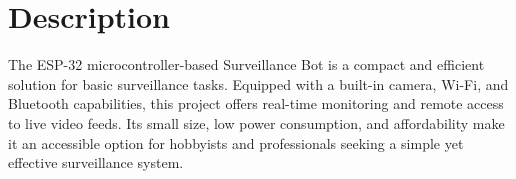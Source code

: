 \documentclass[12pt]{article}
\begin{document}


\thispagestyle{empty}


\newpage

\tableofcontents 

\newpage


\sectionfont{\setcounter{secnumdepth}{0}}
\section{Description}

The ESP-32 microcontroller-based Surveillance Bot is a compact and efficient solution for basic surveillance tasks. Equipped with a built-in camera, Wi-Fi, and Bluetooth capabilities, this project offers real-time monitoring and remote access to live video feeds. Its small size, low power consumption, and affordability make it an accessible option for hobbyists and professionals seeking a simple yet effective surveillance system. 
\end{document}
